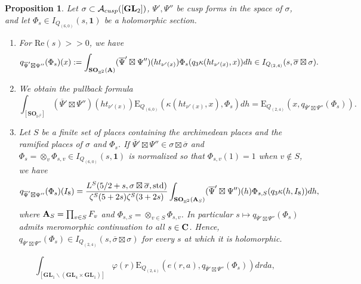 \documentclass[10pt,a4paper]{amsart}
\newtheorem{proposition}{Proposition}
\def\A{{\bf A}}
\def\C{{\bf C}}
\def\GL{\mathbf{GL}}
\begin{document}
\begin{proposition}\label{Proposition:Pullback:Orthogonal}
    Let $\sigma \subset \mathcal{A}_{\rm cusp}([\GL_2])$, $\Psi',\Psi''$ be cusp forms in the space of $\sigma$, and let $\Phi_{s} \in  I_{Q_{(6,0)}}(s,\mathbf{1}) $ be a holomorphic section.
    \begin{enumerate}
    \item For $\mathrm{Re}(s)>>0$, we have
    \begin{align*}
    q_{\overline{\Psi}'\boxtimes\Psi''}(\Phi_{s})(x) := \int_{\mathbf{SO}_{\mathbb{H}^2}(\A)}(\overline{\Psi}'\boxtimes\Psi'')(ht_{\nu'(x)})\Phi_{s}(q_3\kappa(ht_{\nu'(x)},x))dh\in I_{Q_{(2,4)}}(s,\overline{\sigma}\boxtimes \sigma).
    \end{align*}
    \item We obtain the pullback formula
    \[\int_{[\mathbf{SO}_{\mathbb{H}^2}]}(\overline{\Psi}'\boxtimes\Psi'')(ht_{\nu'(x)})\mathrm{E}_{Q_{(6,0)}}(\kappa(h t_{\nu'(x)},x),\Phi_{s})dh = \mathrm{E}_{Q_{(2,4)}}(x,q_{\overline{\Psi}'\boxtimes\Psi''}(\Phi_{s})).\]
    \item Let $S$ be a finite set of places containing the archimedean places and the ramified places of $\sigma$ and $\Phi_s$. If $\overline{\Psi}'\boxtimes\Psi'' \in   \sigma\boxtimes \overline{\sigma}$ and $\Phi_{s} = \otimes_v \Phi_{s,v}\in I_{Q_{(6,0)}}(s,\mathbf{1})$ is normalized so that $\Phi_{s,v}(1) = 1$ when $v \not \in S$, we have \[q_{\overline{\Psi}'\boxtimes\Psi''}(\Phi_{s})(I_8) =  \frac{L^S(5/2+s,\sigma\boxtimes\overline{\sigma},\mathrm{std})}{\zeta^S(5+2s)\zeta^S(3+2s)} \int_{\mathbf{SO}_{\mathbb{H}^2}(\A_S)}(\overline{\Psi}'\boxtimes\Psi'')(h)\Phi_{s,S}(q_3\kappa(h,I_8))dh,\] 
    where $\A_S = \prod_{v\in S} F_v$ and $ \Phi_{s,S} = \otimes_{v \in S} \Phi_{s,v}$. In particular $s\mapsto q_{\overline{\Psi}'\boxtimes\Psi''}(\Phi_{s})$ admits meromorphic continuation to all $s\in \C$. Hence,  $q_{\overline{\Psi}'\boxtimes\Psi''}(\Phi_{s})\in I_{Q_{(2,4)}}(s,\overline{\sigma}\boxtimes \sigma)$ for every $s$ at which it is holomorphic.
    \end{enumerate}
\end{proposition}

\begin{equation}\label{Integral:Section:Period:Final}\int_{[ \GL_1 \backslash (\GL_4 \times \GL_1)]}\varphi(r)\mathrm{E}_{Q_{(2,4)}}(e(r,a),q_{\overline{\Psi}'\boxtimes\Psi''}(\Phi_{s})) drda,\end{equation}
\end{document}
